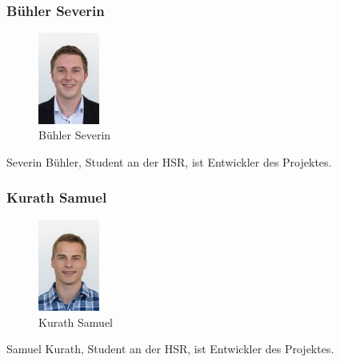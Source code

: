 \subsubsection{Bühler Severin}
\noindent\begin{minipage}{0.5\textwidth}
\begin{figure}[H]
	\centering
	\includegraphics[height=30mm]{images/sbuehler.jpg}
	\caption{Bühler Severin}
\end{figure}
\end{minipage}
\hfill
\begin{minipage}{0.5\textwidth}
Severin Bühler, Student an der HSR, ist Entwickler des Projektes. \\
\end{minipage}

\subsubsection{Kurath Samuel}
\noindent\begin{minipage}{0.5\textwidth}
\begin{figure}[H]
	\centering
	\includegraphics[height=30mm]{images/skurath.jpg}
	\caption{Kurath Samuel}
\end{figure}
\end{minipage}
\hfill
\begin{minipage}{0.5\textwidth}
Samuel Kurath, Student an der HSR, ist Entwickler des Projektes. \\
\end{minipage}